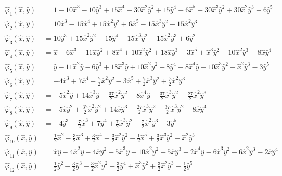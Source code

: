 \begin{equation}
\begin{split}
  \hat{\varphi}_1(\hat{x},\hat{y}) &= 1-10\hat{x}^3-10\hat{y}^3+15\hat{x}^4-30\hat{x}^2\hat{y}^2+15\hat{y}^4-6\hat{x}^5+30\hat{x}^3\hat{y}^2+30\hat{x}^2\hat{y}^3-6\hat{y}^5 \\
  \hat{\varphi}_2(\hat{x},\hat{y}) &= 10\hat{x}^3-15\hat{x}^4+15\hat{x}^2\hat{y}^2+6\hat{x}^5-15\hat{x}^3\hat{y}^2-15\hat{x}^2\hat{y}^3 \\
  \hat{\varphi}_3(\hat{x},\hat{y}) &= 10\hat{y}^3+15\hat{x}^2\hat{y}^2-15\hat{y}^4-15\hat{x}^3\hat{y}^2-15\hat{x}^2\hat{y}^3+6\hat{y}^2 \\
  \hat{\varphi}_4(\hat{x},\hat{y}) &= \hat{x}-6\hat{x}^3-11\hat{x}\hat{y}^2+8\hat{x}^4+10\hat{x}^2\hat{y}^2+18\hat{x}\hat{y}^3-3\hat{x}^5+\hat{x}^3\hat{y}^2-10\hat{x}^2\hat{y}^3-8\hat{x}\hat{y}^4 \\
  \hat{\varphi}_5(\hat{x},\hat{y}) &= \hat{y}-11\hat{x}^2\hat{y}-6\hat{y}^3+18\hat{x}^3\hat{y}+10\hat{x}^2\hat{y}^2+8\hat{y}^4-8\hat{x}^4\hat{y}-10\hat{x}^3\hat{y}^2+\hat{x}^2\hat{y}^3-3\hat{y}^5 \\
  \hat{\varphi}_6(\hat{x},\hat{y}) &= -4\hat{x}^3+7\hat{x}^4-\frac{7}{2}\hat{x}^2\hat{y}^2-3\hat{x}^5+\frac{7}{2}\hat{x}^3\hat{y}^2+\frac{7}{2}\hat{x}^2\hat{y}^3 \\
  \hat{\varphi}_7(\hat{x},\hat{y}) &= -5\hat{x}^2\hat{y}+14\hat{x}^3\hat{y}+\frac{37}{2}\hat{x}^2\hat{y}^2-8\hat{x}^4\hat{y}-\frac{37}{2}\hat{x}^3\hat{y}^2-\frac{27}{2}\hat{x}^2\hat{y}^3 \\
  \hat{\varphi}_8(\hat{x},\hat{y}) &= -5\hat{x}\hat{y}^2+\frac{37}{2}\hat{x}^2\hat{y}^2+14\hat{x}\hat{y}^3-\frac{27}{2}\hat{x}^3\hat{y}^2-\frac{37}{2}\hat{x}^3\hat{y}^2-8\hat{x}\hat{y}^4 \\
  \hat{\varphi}_9(\hat{x},\hat{y}) &= -4\hat{y}^3-\frac{7}{2}\hat{x}^3+7\hat{y}^4+\frac{7}{2}\hat{x}^3\hat{y}^2+\frac{7}{2}\hat{x}^2\hat{y}^3-3\hat{y}^5 \\
  \hat{\varphi}_{10}(\hat{x},\hat{y}) &= \frac{1}{2}\hat{x}^2-\frac{3}{2}\hat{x}^3+\frac{3}{2}\hat{x}^4-\frac{3}{2}\hat{x}^2\hat{y}^2-\frac{1}{2}\hat{x}^5+\frac{3}{2}\hat{x}^3\hat{y}^2+\hat{x}^2\hat{y}^3 \\
  \hat{\varphi}_{11}(\hat{x},\hat{y}) &= \hat{x}\hat{y}-4\hat{x}^2\hat{y}-4\hat{x}\hat{y}^2+5\hat{x}^3\hat{y}+10\hat{x}^2\hat{y}^2+5\hat{x}\hat{y}^3-2\hat{x}^4\hat{y}-6\hat{x}^3\hat{y}^2-6\hat{x}^2\hat{y}^3-2\hat{x}\hat{y}^4 \\
  \hat{\varphi}_{12}(\hat{x},\hat{y}) &= \frac{1}{2}\hat{y}^2-\frac{3}{2}\hat{y}^3-\frac{3}{2}\hat{x}^2\hat{y}^2+\frac{3}{2}\hat{y}^4+\hat{x}^3\hat{y}^2+\frac{3}{2}\hat{x}^2\hat{y}^3-\frac{1}{2}\hat{y}^5 \\

\end{split}
\end{equation}
